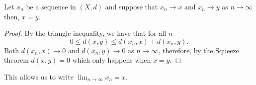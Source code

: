 \documentclass[12pt, a4paper]{article}
\begin{document}
\begin{lemma}
    Let \(x_n\) be a sequence in \((X,d)\) and suppose that \(x_n \to x\) and \(x_n \to y\) as \(n \to \infty\) then, \(x=y\).
\end{lemma}

\begin{proof}
    By the triangle inequality, we have that for all \(n\)
    \[0 \leq d(x,y) \leq d(x_n,x) + d(x_n,y).\]
    Both \(d(x_n,x) \to 0\) and \(d(x_n,y) \to 0\) as \(n \to \infty\), therefore, by the Squeeze theorem \(d(x,y)=0\) which only happens when \(x=y\).
\end{proof}

\begin{mdremark}
    This allows us to write \(\lim_{n \to \infty} x_n =x\).
\end{mdremark}
\end{document}
